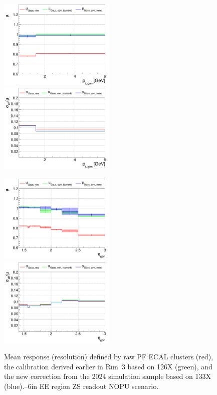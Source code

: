 \begin{figure}
\includegraphics[width=0.495\textwidth]{./plots_pdf/ECAL_plots/plotsNoPU/EE/pdf/ZS/GENPT/EEZS_GENPT_0000_0006_MuOverBins.pdf}
\includegraphics[width=0.495\textwidth]{./plots_pdf/ECAL_plots/plotsNoPU/EE/pdf/ZS/GENPT/EEZS_GENPT_0000_0006_EffSigmaOverBins.pdf}

\includegraphics[width=0.495\textwidth]{./plots_pdf/ECAL_plots/plotsNoPU/EE/pdf/ZS/GENETA/EEZS_GENETA_0000_0006_MuOverBins.pdf}
\includegraphics[width=0.495\textwidth]{./plots_pdf/ECAL_plots/plotsNoPU/EE/pdf/ZS/GENETA/EEZS_GENETA_0000_0006_EffSigmaOverBins.pdf}
\caption[$\mu$ ($\sigma_\mathrm{eff}$) vs. \pt of PF ECAL cluster - EE ZS readout NoPU scenario]{Mean response (resolution) defined by raw PF ECAL clusters (red), the calibration derived earlier in Run~3 based on 126X (green), and the new correction from the 2024 simulation sample based on 133X (blue).--6\GeV in EE region ZS readout NOPU scenario.}
\end{figure}

